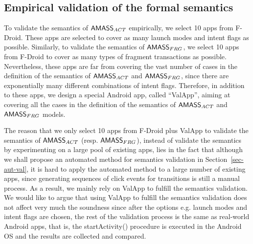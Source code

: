 \subsection{Empirical validation of the formal semantics}\label{sec:val-exp}

To validate the semantics of $\textsf{AMASS}_{ACT}$ empirically, we select 10 apps from F-Droid. These apps are selected to cover as many launch modes and intent flags as possible.  Similarly, to validate the semantics of $\textsf{AMASS}_{FRG}$, we select 10 apps from F-Droid to cover as many types of fragment transactions as possible. Nevertheless, these apps are far from covering the vast number of cases in the definition of the semantics of $\textsf{AMASS}_{ACT}$ and $\textsf{AMASS}_{FRG}$, since there are exponentially many different combinations of intent flags. 
Therefore, in addition to these apps, we design a special Android app, called ``ValApp'', aiming at covering all the cases in the definition of the semantics of $\textsf{AMASS}_{ACT}$ and $\textsf{AMASS}_{FRG}$ models. 

The reason that we only select 10 apps from F-Droid plus ValApp to validate the semantics of $\textsf{AMASS}_{ACT}$ (resp. $\textsf{AMASS}_{FRG}$), instead of validate the semantics by experimenting on a large pool of existing apps, lies in the fact that although we shall propose an automated method for semantics validation in Section~\ref{sec-aut-val}, it is hard to apply the automated method to a large number of existing apps,  since generating sequences of click events for transitions is still a manual process. As a result, we mainly rely on ValApp to fulfill the semantics validation. We would like to argue that using ValApp to fulfill the semantics validation does not affect very much the soundness since after the options e.g. launch modes and intent flags are chosen, the rest of the validation process is the same as real-world Android apps, that is, the startActivity() procedure is executed in the Android OS and the results are collected and compared. 


